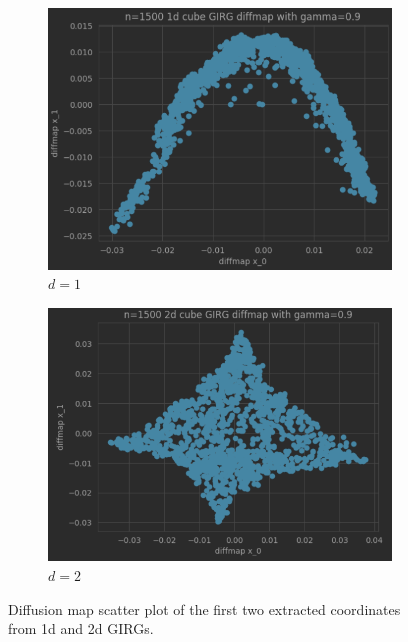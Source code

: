 \begin{figure}
    \centering

    \begin{subfigure}{0.49\textwidth}
      \centering
      \includegraphics[width=\linewidth]{figures/1d_GIRG_diffmap.png}
      \caption{$d=1$}
      \label{fig:sub1}
    \end{subfigure}
    \hfill
    \begin{subfigure}{0.49\textwidth}
      \centering
      \includegraphics[width=\linewidth]{figures/2d_GIRG_diffmap.png}
      \caption{$d=2$}
      \label{fig:cube_diffmap_plots_d2}
    \end{subfigure}

  
    \caption{Diffusion map scatter plot of the first two extracted coordinates from 1d and 2d GIRGs.}
    \label{fig:cube_diffmap_plots_d1and2}
\end{figure}


